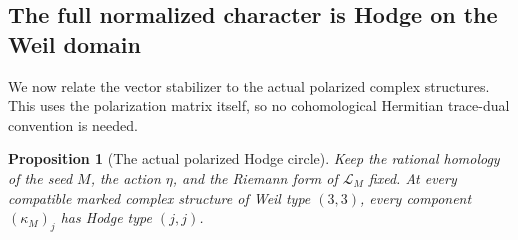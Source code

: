 \documentclass[11pt]{article}
\newtheorem{proposition}[theorem]{Proposition}
\numberwithin{equation}{section}
\begin{document}
\subsection{The full normalized character is Hodge on the Weil domain}

We now relate the vector stabilizer to the actual polarized complex
structures.  This uses the polarization matrix itself, so no
cohomological Hermitian trace-dual convention is needed.

\begin{proposition}[The actual polarized Hodge circle]
\label{p3sw:hodge-circle}
Keep the rational homology of the seed \(M\), the action \(\eta\),
and the Riemann form of \(\mathscr L_M\) fixed.  At every compatible
marked complex structure of Weil type \((3,3)\), every component
\((\kappa_M)_j\) has Hodge type \((j,j)\).
\end{proposition}
\end{document}
